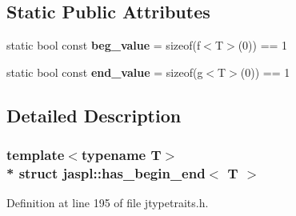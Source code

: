 \subsection*{Static Public Attributes}
\begin{DoxyCompactItemize}
\item 
static bool const {\bfseries beg\+\_\+value} = sizeof(f$<$T$>$(0)) == 1\hypertarget{structjaspl_1_1has__begin__end_a4878c9fba5b7b022c0a39cbde10e51c9}{}\label{structjaspl_1_1has__begin__end_a4878c9fba5b7b022c0a39cbde10e51c9}

\item 
static bool const {\bfseries end\+\_\+value} = sizeof(g$<$T$>$(0)) == 1\hypertarget{structjaspl_1_1has__begin__end_ac37f7ddbd100388fc793f5134d32b156}{}\label{structjaspl_1_1has__begin__end_ac37f7ddbd100388fc793f5134d32b156}

\end{DoxyCompactItemize}


\subsection{Detailed Description}
\subsubsection*{template$<$typename T$>$\\*
struct jaspl\+::has\+\_\+begin\+\_\+end$<$ T $>$}



Definition at line 195 of file jtypetraits.\+h.

